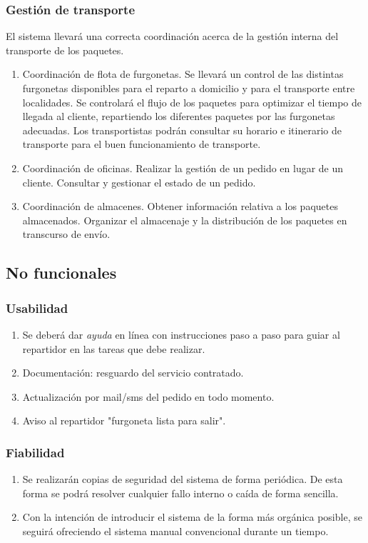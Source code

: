 \subsubsection{Gestión de transporte}
El sistema llevará una correcta coordinación acerca de la gestión interna del transporte de los paquetes.
\begin{enumerate}
	\item Coordinación de flota de furgonetas.
	\subitem Se llevará un control de las distintas furgonetas disponibles para el reparto a domicilio y para el transporte entre localidades.
	\subitem Se controlará el flujo de los paquetes para optimizar el tiempo de llegada al cliente, repartiendo los diferentes
 paquetes por las furgonetas adecuadas.
 	\subitem Los transportistas podrán consultar su horario e itinerario de transporte para el buen funcionamiento de transporte.

	\item Coordinación de oficinas.
	\subitem Realizar la gestión de un pedido en lugar de un cliente.
	\subitem Consultar y gestionar el estado de un pedido.
	
	\item Coordinación de almacenes.
	\subitem Obtener información relativa a los paquetes almacenados.
	\subitem Organizar el almacenaje y la distribución de los paquetes en transcurso de envío.
\end{enumerate}

\subsection{No funcionales}
\subsubsection{Usabilidad}
\begin{enumerate}
	\item Se deberá dar \textit{ayuda} en línea con instrucciones paso a paso para guiar al repartidor en las tareas que debe realizar.
	\item Documentación: resguardo del servicio contratado.
	\item Actualización por mail/sms del pedido en todo momento.
	\item Aviso al repartidor "furgoneta lista para salir".
	
\end{enumerate}
\subsubsection{Fiabilidad}
\begin{enumerate}
	\item Se realizarán copias de seguridad del sistema de forma periódica. De esta forma se podrá resolver cualquier fallo interno o caída de forma sencilla.
	\item Con la intención de introducir el sistema de la forma más orgánica posible, se seguirá ofreciendo el sistema manual convencional durante un tiempo.
\end{enumerate}


